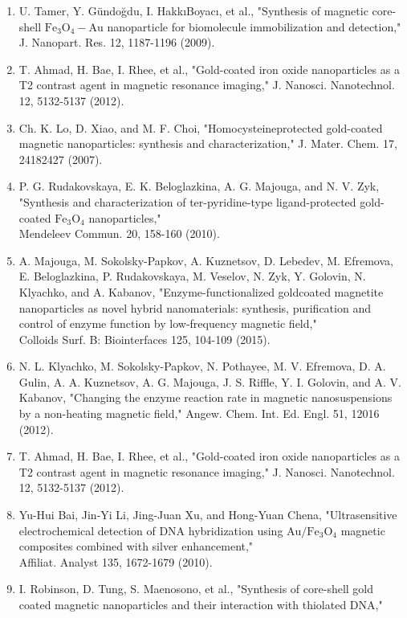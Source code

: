 \documentclass[10pt, a4paper]{article}
\begin{document}
\begin{enumerate}
  \item U. Tamer, Y. Gündoğdu, I. HakkıBoyacı, et al., "Synthesis of magnetic core-shell \(\mathrm{Fe}_{3} \mathrm{O}_{4}-\mathrm{Au}\) nanoparticle for biomolecule immobilization and detection," J. Nanopart. Res. 12, 1187-1196 (2009).
  \item T. Ahmad, H. Bae, I. Rhee, et al., "Gold-coated iron oxide nanoparticles as a T2 contrast agent in magnetic resonance imaging," J. Nanosci. Nanotechnol. 12, 5132-5137 (2012).
  \item Ch. K. Lo, D. Xiao, and M. F. Choi, "Homocysteineprotected gold-coated magnetic nanoparticles: synthesis and characterization," J. Mater. Chem. 17, 24182427 (2007).
  \item P. G. Rudakovskaya, E. K. Beloglazkina, A. G. Majouga, and N. V. Zyk, "Synthesis and characterization of ter-pyridine-type ligand-protected gold-coated \(\mathrm{Fe}_{3} \mathrm{O}_{4}\) nanoparticles," \\
  Mendeleev Commun. 20, 158-160 (2010).
  \item A. Majouga, M. Sokolsky-Papkov, A. Kuznetsov, D. Lebedev, M. Efremova, E. Beloglazkina, P. Rudakovskaya, M. Veselov, N. Zyk, Y. Golovin, N. Klyachko, and A. Kabanov, "Enzyme-functionalized goldcoated magnetite nanoparticles as novel hybrid nanomaterials: synthesis, purification and control of enzyme function by low-frequency magnetic field," \\
  Colloids Surf. B: Biointerfaces 125, 104-109 (2015).
  \item N. L. Klyachko, M. Sokolsky-Papkov, N. Pothayee, M. V. Efremova, D. A. Gulin, A. A. Kuznetsov, A. G. Majouga, J. S. Riffle, Y. I. Golovin, and A. V. Kabanov, "Changing the enzyme reaction rate in magnetic nanosuspensions by a non-heating magnetic field," Angew. Chem. Int. Ed. Engl. 51, 12016 (2012).
  \item T. Ahmad, H. Bae, I. Rhee, et al., "Gold-coated iron oxide nanoparticles as a T2 contrast agent in magnetic resonance imaging," J. Nanosci. Nanotechnol. 12, 5132-5137 (2012).
  \item Yu-Hui Bai, Jin-Yi Li, Jing-Juan Xu, and Hong-Yuan Chena, "Ultrasensitive electrochemical detection of DNA hybridization using \(\mathrm{Au} / \mathrm{Fe}_{3} \mathrm{O}_{4}\) magnetic composites combined with silver enhancement," \\
  Affiliat. Analyst 135, 1672-1679 (2010).
  \item I. Robinson, D. Tung, S. Maenosono, et al., "Synthesis of core-shell gold coated magnetic nanoparticles and their interaction with thiolated DNA," \\

\end{enumerate}
\end{document}
